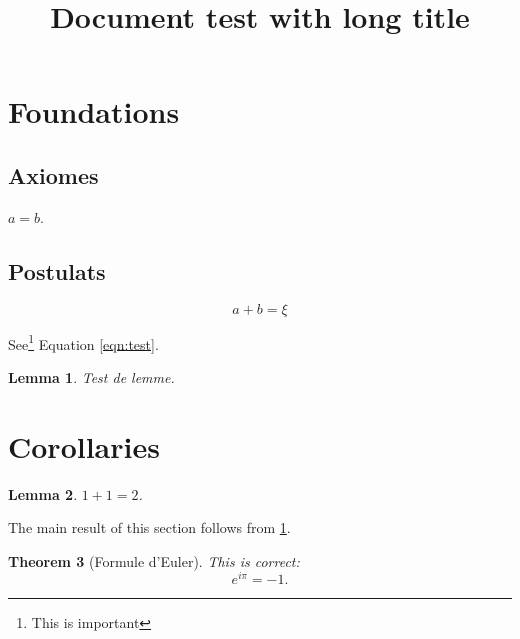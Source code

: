 \documentclass[a4paper]{article}
\title{Document test with long title}
\newtheorem{theorem}{Theorem}[section]
\newtheorem{lem}[theorem]{Lemma}
\begin{document}
\section{Foundations}
\subsection{Axiomes}

$a = b$.

\subsection{Postulats}
\begin{equation}
\label{eqn:test}
a+b = ξ
\end{equation}

See\footnote{This is important} Equation \ref{eqn:test}.

\begin{lem}
	\label{lem1}
	Test de lemme.
\end{lem}

\section{Corollaries}

\begin{lem}
	\label{lem2}
	$1 + 1 = 2$.
\end{lem}

The main result of this section follows from \ref{lem1}.

\begin{theorem}[Formule d'Euler]
This is correct:
\[
	e^{i\pi} = -1.
\]
\end{theorem}
\end{document}
